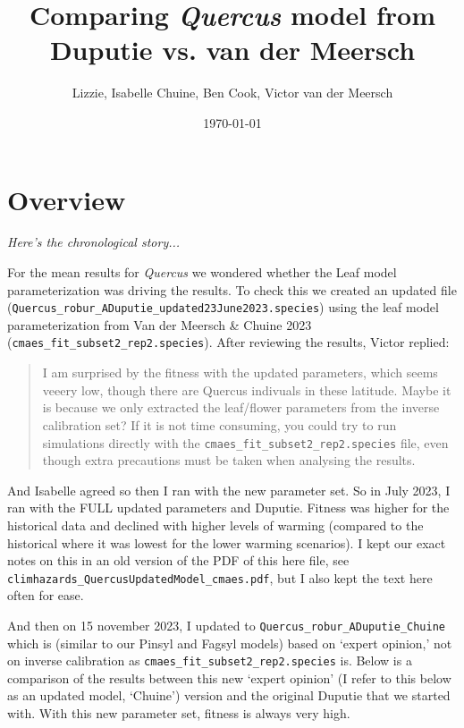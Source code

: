 \documentclass[11pt,letter]{article}
\begin{document}

\renewcommand{\refname}{\CHead{}}

\title{Comparing \emph{Quercus} model from \\ Duputie vs. van der Meersch}
\author{Lizzie, Isabelle Chuine, Ben Cook, Victor van der Meersch}
\date{\today}
\maketitle


\section*{Overview}
\emph{Here's the chronological story...}

For the mean results for \emph{Quercus} we wondered whether the Leaf model parameterization was driving the results. To check this we created an updated file\\
 (\verb|Quercus_robur_ADuputie_updated23June2023.species|) using the leaf model parameterization from Van der Meersch \& Chuine 2023 \\(\verb|cmaes_fit_subset2_rep2.species|). After reviewing the results, Victor replied:

\begin{quote}
I am surprised by the fitness with the updated parameters, which seems veeery low, though there are Quercus indivuals in these latitude.
Maybe it is because we only extracted the leaf/flower parameters from the inverse calibration set?
If it is not time consuming, you could try to run simulations directly with the \verb|cmaes_fit_subset2_rep2.species| file, even though extra precautions must be taken when analysing the results.
\end{quote}

And Isabelle agreed so then I ran with the new parameter set. So in July 2023, I ran with the FULL updated parameters and Duputie. Fitness was higher for the historical data and declined with higher levels of warming (compared to the historical where it was lowest for the lower warming scenarios). I kept our exact notes on this in an old version of the PDF of this here file, see \verb|climhazards_QuercusUpdatedModel_cmaes.pdf|, but I also kept the text here often for ease. 

And then on 15 november 2023, I updated to \verb|Quercus_robur_ADuputie_Chuine| which is (similar to our Pinsyl and Fagsyl models) based on `expert opinion,' not on inverse calibration as \verb|cmaes_fit_subset2_rep2.species| is. Below is a comparison of the results between this new `expert opinion' (I refer to this below as an updated model, `Chuine') version and the original Duputie that we started with. With this new parameter set, fitness is always very high. 
\end{document}
